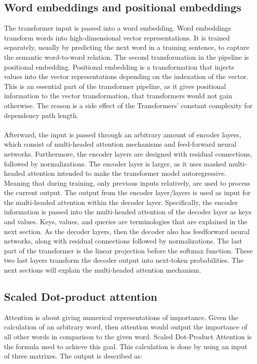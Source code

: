 \subsection{Word embeddings and positional embeddings} \label{sec:WE}
The transformer input is passed into a word embedding. Word embeddings transform words into high-dimensional vector representations. It is trained separately, usually by predicting the next word in a training sentence, to capture the semantic word-to-word relation. The second transformation in the pipeline is positional embedding. Positional embedding is a transformation that injects values into the vector representations depending on the indexation of the vector. This is an essential part of the transformer pipeline, as it gives positional information to the vector transformation, that transformers would not gain otherwise. The reason is a side effect of the Transformers' constant complexity for dependency path length. 
\\\\
Afterward, the input is passed through an arbitrary amount of encoder layers, which consist of multi-headed attention mechanisms and feed-forward neural networks. Furthermore, the encoder layers are designed with residual connections, followed by normalizations. The encoder layer is larger, as it uses masked multi-headed attention intended to make the transformer model autoregressive. Meaning that during training, only previous inputs relatively, are used to process the current output. 
The output from the encoder layer/layers is used as input for the multi-headed attention within the decoder layer. Specifically, the encoder information is passed into the multi-headed attention of the decoder layer as keys and values. Keys, values, and queries are terminologies that are explained in the next section. As the decoder layers, then the decoder also has feedforward neural networks, along with residual connections followed by normalizations. The last part of the transformer is the linear projection before the softmax function. These two last layers transform the decoder output into next-token probabilities. The next sections will explain the multi-headed attention mechanism.


\subsection{Scaled Dot-product attention} \label{sec:SDPA}
Attention is about giving numerical representations of importance. Given the calculation of an arbitrary word, then attention would output the importance of all other words in comparison to the given word. Scaled Dot-Product Attention is the formula used to achieve this goal. This calculation is done by using an input of three matrixes. The output is described as:

